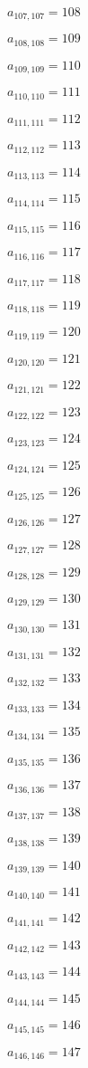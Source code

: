 \documentclass[a4paper,12pt]{article}
\begin{document}
$a _{ 107, 107 } = 108$

$a _{ 108, 108 } = 109$

$a _{ 109, 109 } = 110$

$a _{ 110, 110 } = 111$

$a _{ 111, 111 } = 112$

$a _{ 112, 112 } = 113$

$a _{ 113, 113 } = 114$

$a _{ 114, 114 } = 115$

$a _{ 115, 115 } = 116$

$a _{ 116, 116 } = 117$

$a _{ 117, 117 } = 118$

$a _{ 118, 118 } = 119$

$a _{ 119, 119 } = 120$

$a _{ 120, 120 } = 121$

$a _{ 121, 121 } = 122$

$a _{ 122, 122 } = 123$

$a _{ 123, 123 } = 124$

$a _{ 124, 124 } = 125$

$a _{ 125, 125 } = 126$

$a _{ 126, 126 } = 127$

$a _{ 127, 127 } = 128$

$a _{ 128, 128 } = 129$

$a _{ 129, 129 } = 130$

$a _{ 130, 130 } = 131$

$a _{ 131, 131 } = 132$

$a _{ 132, 132 } = 133$

$a _{ 133, 133 } = 134$

$a _{ 134, 134 } = 135$

$a _{ 135, 135 } = 136$

$a _{ 136, 136 } = 137$

$a _{ 137, 137 } = 138$

$a _{ 138, 138 } = 139$

$a _{ 139, 139 } = 140$

$a _{ 140, 140 } = 141$

$a _{ 141, 141 } = 142$

$a _{ 142, 142 } = 143$

$a _{ 143, 143 } = 144$

$a _{ 144, 144 } = 145$

$a _{ 145, 145 } = 146$

$a _{ 146, 146 } = 147$
\end{document}
